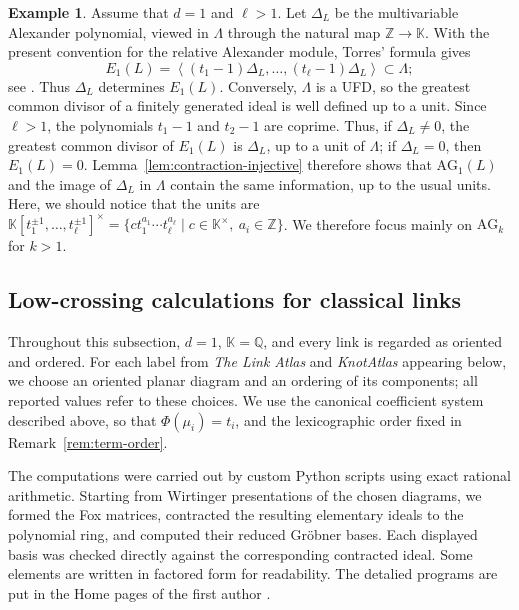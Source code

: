\documentclass{article}
\theoremstyle{definition}
\newtheorem{example}[definition]{Example}
\theoremstyle{plain}
\newcommand{\Q}{{\mathbb{Q}}}
\newcommand{\ideal}[1]{\left\langle #1 \right\rangle}
\newcommand{\AG}{\mathrm{AG}}
\newcommand{\Z}{\mathbb{Z}}
\newcommand{\K}{\mathbb{K}}
\begin{document}
\begin{example}\label{ex:k1}
Assume that \(d=1\) and \(\ell>1\). Let \(\Delta_L\) be the multivariable
Alexander polynomial, viewed in \(\Lambda\) through the natural map
\(\Z\to\K\). With the present convention for the relative Alexander
module, Torres' formula gives
\[
E_1(L)
 =\ideal{
   (t_1-1)\Delta_L,\dots,(t_\ell-1)\Delta_L
  }
 \subset\Lambda;
\]
see \cite[Theorem in \S3]{Torres}. Thus \(\Delta_L\) determines
\(E_1(L)\). Conversely, \(\Lambda\) is a UFD, so the greatest common
divisor of a finitely generated ideal is well defined up to a unit. Since
\(\ell>1\), the polynomials \(t_1-1\) and \(t_2-1\) are coprime. Thus, if
\(\Delta_L\ne0\), the greatest common divisor of \(E_1(L)\) is
\(\Delta_L\), up to a unit of \(\Lambda\); if \(\Delta_L=0\), then
\(E_1(L)=0\). Lemma~\ref{lem:contraction-injective} therefore shows that
\(\AG_1(L)\) and the image of \(\Delta_L\) in \(\Lambda\) contain the same
information, up to the usual units. 
Here, we should notice that the units are 
\(\K[t_1^{\pm1},\dots,t_\ell^{\pm1}]^\times
=\{c t_1^{a_1}\cdots t_\ell^{a_\ell}\mid c\in\K^\times,\ a_i\in\Z\}\).
We therefore focus mainly on
\(\AG_k\) for \(k>1\).
\end{example}


\subsection{Low-crossing calculations for classical links}
\label{subsec:low-crossing-examples}

Throughout this subsection, \(d=1\), \(\K=\Q\), and every link is regarded
as oriented and ordered. For each label from \emph{The Link Atlas} \cite{KnotInfo} and
\emph{KnotAtlas} \cite{KnotAtlas} appearing below, we choose an oriented planar diagram and an
ordering of its components; all reported values refer to these choices. We use
the canonical coefficient system described above, so
that \(\Phi(\mu_i)=t_i\), and the lexicographic order fixed in
Remark~\ref{rem:term-order}.

The computations were carried out by custom Python scripts using exact
rational arithmetic. Starting from Wirtinger presentations of the chosen
diagrams, we formed the Fox matrices, contracted the resulting elementary
ideals to the polynomial ring, and computed their reduced Gr\"obner bases.
Each displayed basis was checked directly against the corresponding contracted
ideal. Some elements are written in factored form for readability.
The detalied programs are put in the Home pages of the first author \cite{NHP}. 
\end{document}
